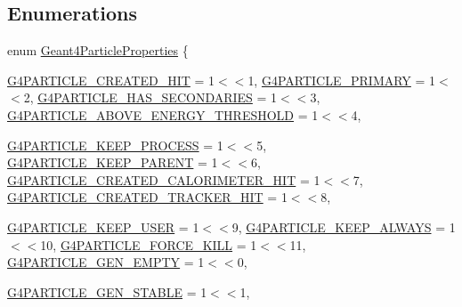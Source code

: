 \subsection*{Enumerations}
\begin{DoxyCompactItemize}
\item 
enum \hyperlink{namespace_d_d4hep_1_1_simulation_a88917bdf7f18e2bbd7c9942c897f100c}{Geant4ParticleProperties} \{ \par
\hyperlink{namespace_d_d4hep_1_1_simulation_a88917bdf7f18e2bbd7c9942c897f100cac3bf9334c33906c798ad95a2749cf888}{G4PARTICLE\_\-CREATED\_\-HIT} =  1$<$$<$1, 
\hyperlink{namespace_d_d4hep_1_1_simulation_a88917bdf7f18e2bbd7c9942c897f100ca5b9ee229766c6b031133aa9cf6e5ef28}{G4PARTICLE\_\-PRIMARY} =  1$<$$<$2, 
\hyperlink{namespace_d_d4hep_1_1_simulation_a88917bdf7f18e2bbd7c9942c897f100ca2a095ad09984c3e85e4c18df167c835f}{G4PARTICLE\_\-HAS\_\-SECONDARIES} =  1$<$$<$3, 
\hyperlink{namespace_d_d4hep_1_1_simulation_a88917bdf7f18e2bbd7c9942c897f100cabc9837cb9145fb42c8ea3cb5e94948b8}{G4PARTICLE\_\-ABOVE\_\-ENERGY\_\-THRESHOLD} =  1$<$$<$4, 
\par
\hyperlink{namespace_d_d4hep_1_1_simulation_a88917bdf7f18e2bbd7c9942c897f100caee6eda91e9a043533e09f198dc4258ea}{G4PARTICLE\_\-KEEP\_\-PROCESS} =  1$<$$<$5, 
\hyperlink{namespace_d_d4hep_1_1_simulation_a88917bdf7f18e2bbd7c9942c897f100ca4b4ba1710e21e359111a7c2f5949c844}{G4PARTICLE\_\-KEEP\_\-PARENT} =  1$<$$<$6, 
\hyperlink{namespace_d_d4hep_1_1_simulation_a88917bdf7f18e2bbd7c9942c897f100ca16298b761d3006252653f1bf64217240}{G4PARTICLE\_\-CREATED\_\-CALORIMETER\_\-HIT} =  1$<$$<$7, 
\hyperlink{namespace_d_d4hep_1_1_simulation_a88917bdf7f18e2bbd7c9942c897f100ca46de75b396d4adb8d93a82ff3275e910}{G4PARTICLE\_\-CREATED\_\-TRACKER\_\-HIT} =  1$<$$<$8, 
\par
\hyperlink{namespace_d_d4hep_1_1_simulation_a88917bdf7f18e2bbd7c9942c897f100cabeedb672348df10fe9b2ed3815e7db8a}{G4PARTICLE\_\-KEEP\_\-USER} =  1$<$$<$9, 
\hyperlink{namespace_d_d4hep_1_1_simulation_a88917bdf7f18e2bbd7c9942c897f100caf07334b306df481d8beb07cad7207677}{G4PARTICLE\_\-KEEP\_\-ALWAYS} =  1$<$$<$10, 
\hyperlink{namespace_d_d4hep_1_1_simulation_a88917bdf7f18e2bbd7c9942c897f100ca68b385578d3ddf29690dff5486dc0190}{G4PARTICLE\_\-FORCE\_\-KILL} =  1$<$$<$11, 
\hyperlink{namespace_d_d4hep_1_1_simulation_a88917bdf7f18e2bbd7c9942c897f100caa8271966ffbb0167cdab36566e91ca89}{G4PARTICLE\_\-GEN\_\-EMPTY} =  1$<$$<$0, 
\par
\hyperlink{namespace_d_d4hep_1_1_simulation_a88917bdf7f18e2bbd7c9942c897f100ca24f8b7a443a53143ecf382725a114aab}{G4PARTICLE\_\-GEN\_\-STABLE} =  1$<$$<$1, 
$$
\end{DoxyCompactItemize}
